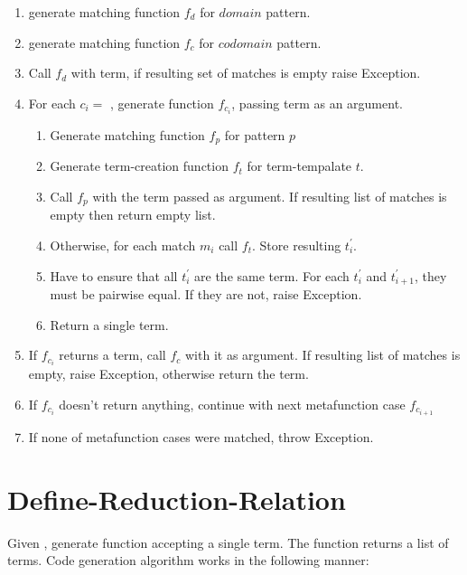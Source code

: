 \begin{enumerate}
\item generate matching function $f_d$ for $domain$ pattern.
\item generate matching function $f_c$ for $codomain$ pattern.
\item Call $f_d$ with term, if resulting set of matches is empty raise Exception.
\item For each $c_i =$ \MetafunctionCase, generate function $f_{c_i}$, passing term as an argument.
\begin{enumerate}
	\item Generate matching function $f_{p}$ for pattern $p$
	\item Generate term-creation function $f_t$ for term-tempalate $t$.
	\item Call $f_p$ with the term passed as argument. If resulting list of matches is empty then return empty list.
	\item Otherwise, for each match $m_i$ call $f_t$. Store resulting $t_i^\prime$.
	\item Have to ensure that all $t_i^\prime$ are the same term. For each $t_i^\prime$ and $t_{i+1}^\prime$, they must be pairwise equal. If they are not, raise Exception.
	\item Return a single term.
\end{enumerate}
\item If $f_{c_i}$ returns a term, call $f_c$ with it as argument. If resulting list of matches is empty, raise Exception, otherwise return the term.
\item If $f_{c_i}$ doesn't return anything, continue with next metafunction case $f_{c_{i+1}}$
\item If none of metafunction cases were matched, throw Exception.
\end{enumerate}

\section{Define-Reduction-Relation}
Given \DefineReductionRelation, generate function accepting a single term. The function returns a list of terms. Code generation algorithm works in the following manner:

